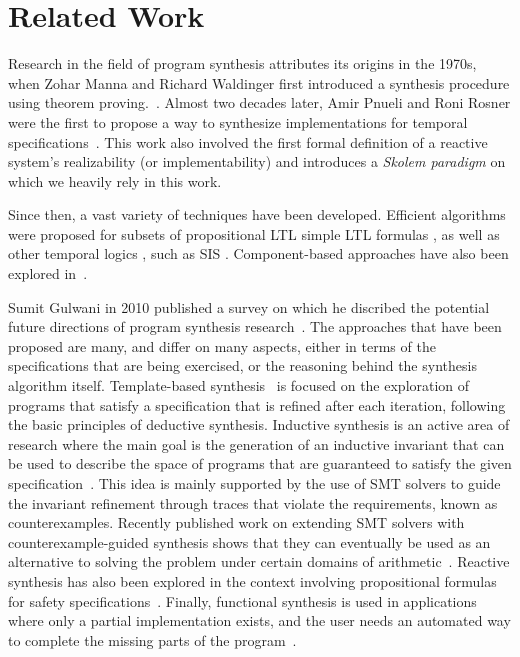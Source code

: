 \section{Related Work}

Research in the field of program synthesis attributes its origins in the 1970s,
when Zohar Manna and Richard Waldinger first introduced a synthesis procedure
using theorem proving.~\cite{manna1971toward}. Almost two decades later, Amir
Pnueli and Roni Rosner were the first to propose a way to synthesize
implementations for temporal specifications~\cite{Pnueli89}. This work also
involved the first formal definition of a reactive system's realizability (or implementability) and
introduces a \emph{Skolem paradigm} on which we heavily rely in this work.


Since then, a vast variety of techniques have been developed. Efficient
algorithms were proposed for subsets of propositional LTL
\cite{Klein10,tomita2016safraless,ehlers2010symbolic,cheng2016structural} simple
LTL formulas \cite{Bohy12,hagihara2016simple,Tini03}, as well as other temporal
logics \cite{benevs2012factorization,monmege2016real,Hamza10}, such as SIS \cite{Aziz95}.
Component-based approaches have also been explored in~\cite{Chatterjee07,dammyou}.

Sumit Gulwani in 2010 published a survey on which he discribed the
potential future directions of program synthesis research~\cite{gulwani2010dimensions}.
The approaches that have been proposed are many, and differ on many aspects,
either in terms of the specifications that are being exercised, or the reasoning
behind the synthesis algorithm itself. Template-based
synthesis~\cite{srivastava2013template} is focused on the exploration of
programs that satisfy a specification that is refined after each
iteration, following the basic principles of deductive synthesis. Inductive
synthesis is an active area of research where the main goal
is the generation of an inductive invariant that can be used to describe the
space of programs that are guaranteed to satisfy the given
specification~\cite{flener2001inductive}.
This idea is mainly supported by the use of SMT solvers to guide the invariant
refinement through traces that violate the requirements, known as
counterexamples. Recently published work on extending SMT solvers with
counterexample-guided synthesis shows that they can eventually be
used as an alternative to solving the problem under certain domains of
arithmetic~\cite{reynoldscounterexample}. Reactive synthesis has also
been explored in the context involving propositional formulas for safety
specifications~\cite{bloem2016satisfiability}. Finally, functional synthesis is
used in applications where only a partial implementation exists, and the user needs an automated way to complete the missing parts of the program~\cite{kneuss2013integrating}.

